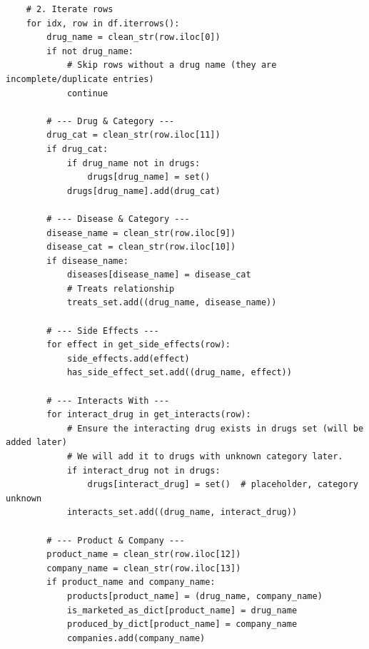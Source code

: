 \documentclass[15pt,a4paper]{article}
\begin{document}
\begin{lstlisting}
    # 2. Iterate rows
    for idx, row in df.iterrows():
        drug_name = clean_str(row.iloc[0])
        if not drug_name:
            # Skip rows without a drug name (they are incomplete/duplicate entries)
            continue

        # --- Drug & Category ---
        drug_cat = clean_str(row.iloc[11])
        if drug_cat:
            if drug_name not in drugs:
                drugs[drug_name] = set()
            drugs[drug_name].add(drug_cat)

        # --- Disease & Category ---
        disease_name = clean_str(row.iloc[9])
        disease_cat = clean_str(row.iloc[10])
        if disease_name:
            diseases[disease_name] = disease_cat
            # Treats relationship
            treats_set.add((drug_name, disease_name))

        # --- Side Effects ---
        for effect in get_side_effects(row):
            side_effects.add(effect)
            has_side_effect_set.add((drug_name, effect))

        # --- Interacts With ---
        for interact_drug in get_interacts(row):
            # Ensure the interacting drug exists in drugs set (will be added later)
            # We will add it to drugs with unknown category later.
            if interact_drug not in drugs:
                drugs[interact_drug] = set()  # placeholder, category unknown
            interacts_set.add((drug_name, interact_drug))

        # --- Product & Company ---
        product_name = clean_str(row.iloc[12])
        company_name = clean_str(row.iloc[13])
        if product_name and company_name:
            products[product_name] = (drug_name, company_name)
            is_marketed_as_dict[product_name] = drug_name
            produced_by_dict[product_name] = company_name
            companies.add(company_name)


\end{lstlisting}
\end{document}
